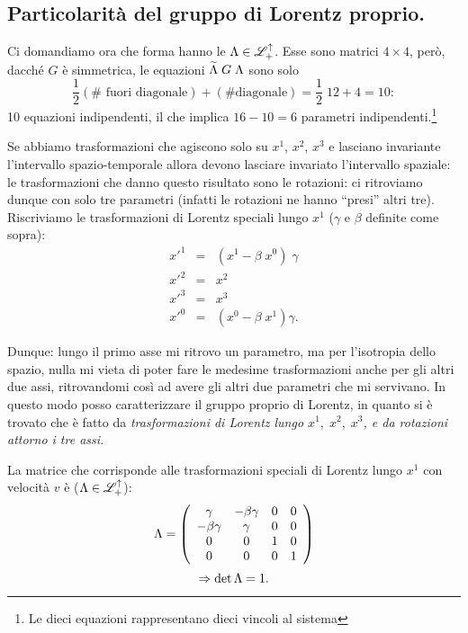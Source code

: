 \subsection{Particolarit\`a del gruppo di Lorentz proprio.}
Ci domandiamo ora che forma hanno le
$\Lambda \in \mathscr{L}^{\uparrow}_{+}$. Esse sono matrici $4\times4$, per\`o,
dacch\'e $G$ \`e simmetrica, le equazioni $\widetilde{\Lambda}\;G\;\Lambda$ sono
solo
\begin{equation}
\frac{1}{2}(\# \mbox{ fuori diagonale}) + (\#\mbox{
 diagonale})=\frac{1}{2}\;12+4=10: 
\end{equation}
10 equazioni indipendenti, il che implica $16-10 = 6$
parametri indipendenti.\footnote{Le dieci equazioni rappresentano dieci
vincoli al sistema}

Se abbiamo trasformazioni che agiscono solo su $x^1$, $x^2$, $x^3$ e
lasciano invariante l'intervallo spazio-temporale allora devono lasciare
invariato l'intervallo spaziale: le trasformazioni che danno questo
risultato sono le rotazioni: ci ritroviamo dunque con solo tre parametri
(infatti le rotazioni ne hanno ``presi'' altri tre). Riscriviamo le
trasformazioni di Lorentz speciali lungo $x^1$ ($\gamma$ e $\beta$
definite come sopra):
\begin{eqnarray*}
x'^1&=&(x^1-\beta\;x^0)\;\gamma\\
x'^2&=&x^2\\
x'^3&=&x^3\\
x'^0&=&(x^0-\beta\;x^1)\gamma. \end{eqnarray*}

Dunque: lungo il primo asse mi ritrovo un parametro, ma per
l'isotropia dello spazio, nulla mi vieta di poter fare le medesime
trasformazioni anche per gli altri due assi, ritrovandomi cos\`i
ad avere gli altri due parametri che mi servivano. In questo modo
posso caratterizzare il gruppo proprio di Lorentz, in quanto si \`e
trovato che \`e fatto da \emph{trasformazioni di Lorentz
lungo $x^1,\;x^2,\;x^3$, e da rotazioni attorno i tre assi.}

La matrice che corrisponde alle trasformazioni speciali di Lorentz
lungo $x^1$ con velocit\`a $v$ \`e ($\Lambda\in
\mathscr{L}_{+}^{\uparrow}$):
\begin{equation}
\Lambda=\left(\begin{array}{cccc}
\gamma&-\beta\gamma&0&0\\-\beta\gamma&\gamma&0&0\\0&0&1&0\\0&0&0&1\\\end{array}\right)
\end{equation}
$$
\Rightarrow\det\Lambda=1.
$$

